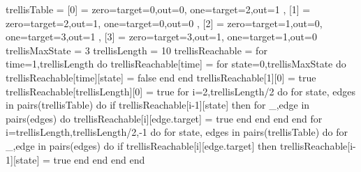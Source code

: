 \begin{luacode}
  trellisTable = {
    [0] = { zero={target=0,out=0}, one={target=2,out=1} },
    [1] = { zero={target=2,out=1}, one={target=0,out=0} },
    [2] = { zero={target=1,out=0}, one={target=3,out=1} },
    [3] = { zero={target=3,out=1}, one={target=1,out=0} }
  }
  trellisMaxState = 3
  trellisLength = 10
  trellisReachable = {}
  for time=1,trellisLength do
    trellisReachable[time] = {}
    for state=0,trellisMaxState do
      trellisReachable[time][state] = false
    end
  end
  trellisReachable[1][0] = true
  trellisReachable[trellisLength][0] = true
  for i=2,trellisLength/2 do
    for state, edges in pairs(trellisTable) do
      if trellisReachable[i-1][state] then
        for _,edge in pairs(edges) do
          trellisReachable[i][edge.target] = true
        end
      end
    end
  end
  for i=trellisLength,trellisLength/2,-1 do
    for state, edges in pairs(trellisTable) do
      for _,edge in pairs(edges) do
        if trellisReachable[i][edge.target] then
          trellisReachable[i-1][state] = true
        end
      end
    end
  end
\end{luacode}
\edef\len{\luav{trellisLength}}
\edef\maxState{\luav{trellisMaxState}}
